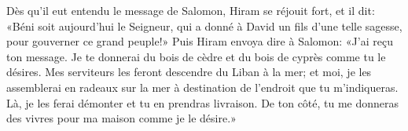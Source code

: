 Dès qu’il eut entendu le message de Salomon, Hiram se réjouit fort, et il dit:
	«Béni soit aujourd’hui le Seigneur,
	qui a donné à David un fils d’une telle sagesse, pour gouverner ce grand peuple!»
Puis Hiram envoya dire à Salomon: «J’ai reçu ton message.
	Je te donnerai du bois de cèdre et du bois de cyprès comme tu le désires.
Mes serviteurs les feront descendre du Liban à la mer;
	et moi, je les assemblerai en radeaux sur la mer
		à destination de l’endroit que tu m’indiqueras.
Là, je les ferai démonter et tu en prendras livraison.
	De ton côté, tu me donneras des vivres pour ma maison comme je le désire.»

